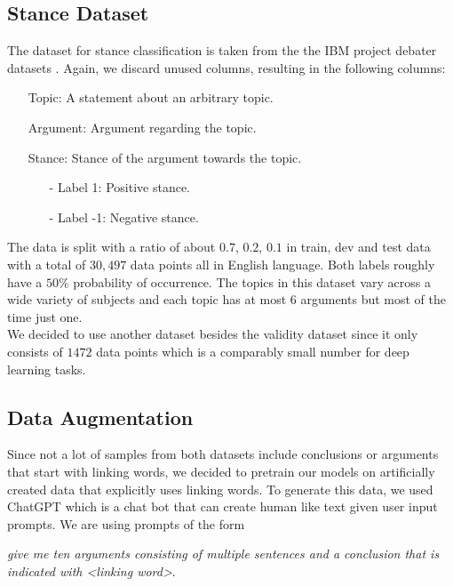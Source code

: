 \subsection{Stance Dataset}

The dataset for stance classification is taken from the the IBM project debater datasets \cite{stancedata, ibm}. Again, we discard unused columns, resulting in the following columns:
\begin{enumerate}
	\item[\textbullet] Topic: A statement about an arbitrary topic.
	\item[\textbullet] Argument: Argument regarding the topic.
	\item[\textbullet] Stance: Stance of the argument towards the topic.
	\begin{enumerate}
		\item[-] Label 1: Positive stance.
		\item[-] Label -1: Negative stance.
	\end{enumerate}
\end{enumerate}
The data is split with a ratio of about $0.7$, $0.2$, $0.1$ in train, dev and test data with a total of $30,497$ data points all in English language. Both labels roughly have a $50\%$ probability of occurrence. The topics in this dataset vary across a wide variety of subjects and each topic has at most $6$ arguments \cite{stancedata} but most of the time just one. \\
We decided to use another dataset besides the validity dataset since it only consists of $1472$ data points which is a comparably small number for deep learning tasks.

\subsection{Data Augmentation}

Since not a lot of samples from both datasets include conclusions or arguments that start with linking words, we decided to pretrain our models on artificially created data that explicitly uses linking words. To generate this data, we used ChatGPT \cite{chatgpt} which is a chat bot that can create human like text given user input prompts. We are using prompts of the form
\begin{center}
	\textit{give me ten arguments consisting of multiple sentences and a conclusion that is indicated with <linking word>}.
\end{center}

